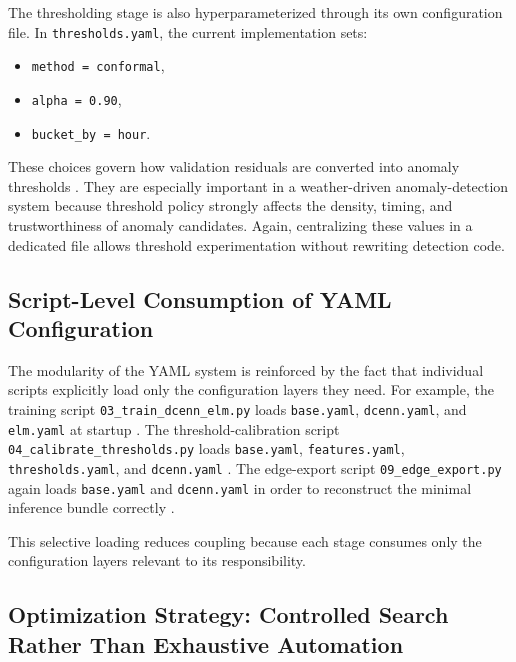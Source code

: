 The thresholding stage is also hyperparameterized through its own configuration file. In \texttt{thresholds.yaml}, the current implementation sets:
\begin{itemize}
	\item \texttt{method = conformal},
	\item \texttt{alpha = 0.90},
	\item \texttt{bucket\_by = hour}.
\end{itemize}
These choices govern how validation residuals are converted into anomaly thresholds \cite{repo_thesis_grid_anomaly}. They are especially important in a weather-driven anomaly-detection system because threshold policy strongly affects the density, timing, and trustworthiness of anomaly candidates. Again, centralizing these values in a dedicated file allows threshold experimentation without rewriting detection code.

\subsection{Script-Level Consumption of YAML Configuration}

The modularity of the YAML system is reinforced by the fact that individual scripts explicitly load only the configuration layers they need. For example, the training script \texttt{03\_train\_dcenn\_elm.py} loads \texttt{base.yaml}, \texttt{dcenn.yaml}, and \texttt{elm.yaml} at startup \cite{repo_thesis_grid_anomaly}. The threshold-calibration script \texttt{04\_calibrate\_thresholds.py} loads \texttt{base.yaml}, \texttt{features.yaml}, \texttt{thresholds.yaml}, and \texttt{dcenn.yaml} \cite{repo_thesis_grid_anomaly}. The edge-export script \texttt{09\_edge\_export.py} again loads \texttt{base.yaml} and \texttt{dcenn.yaml} in order to reconstruct the minimal inference bundle correctly \cite{repo_thesis_grid_anomaly}.

This selective loading reduces coupling because each stage consumes only the configuration layers relevant to its responsibility.

\subsection{Optimization Strategy: Controlled Search Rather Than Exhaustive Automation}

